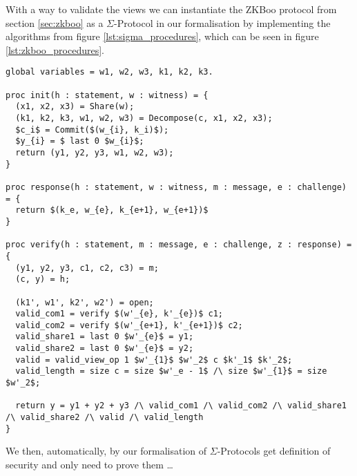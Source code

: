 With a way to validate the views we can instantiate the ZKBoo protocol from
section \ref{sec:zkboo} as a $\Sigma$-Protocol in our formalisation by
implementing the algorithms from figure \ref{lst:sigma_procedures}, which can be
seen in figure \ref{lst:zkboo_procedures}.

\begin{lstlisting}[float, mathescape,label=lst:zkboo_procedures,caption= ZKBoo $\Sigma$-Protocol instantiation]
global variables = w1, w2, w3, k1, k2, k3.

proc init(h : statement, w : witness) = {
  (x1, x2, x3) = Share(w);
  (k1, k2, k3, w1, w2, w3) = Decompose(c, x1, x2, x3);
  $c_i$ = Commit($(w_{i}, k_i)$);
  $y_{i} = $ last 0 $w_{i}$;
  return (y1, y2, y3, w1, w2, w3);
}

proc response(h : statement, w : witness, m : message, e : challenge) = {
  return $(k_e, w_{e}, k_{e+1}, w_{e+1})$
}

proc verify(h : statement, m : message, e : challenge, z : response) = {
  (y1, y2, y3, c1, c2, c3) = m;
  (c, y) = h;

  (k1', w1', k2', w2') = open;
  valid_com1 = verify $(w'_{e}, k'_{e})$ c1;
  valid_com2 = verify $(w'_{e+1}, k'_{e+1})$ c2;
  valid_share1 = last 0 $w'_{e}$ = y1;
  valid_share2 = last 0 $w'_{e}$ = y2;
  valid = valid_view_op 1 $w'_{1}$ $w'_2$ c $k'_1$ $k'_2$;
  valid_length = size c = size $w'_e - 1$ /\ size $w'_{1}$ = size $w'_2$;

  return y = y1 + y2 + y3 /\ valid_com1 /\ valid_com2 /\ valid_share1 /\ valid_share2 /\ valid /\ valid_length
}

\end{lstlisting}

We then, automatically, by our formalisation of $\Sigma$-Protocols get
definition of security and only need to prove them \dots {}

